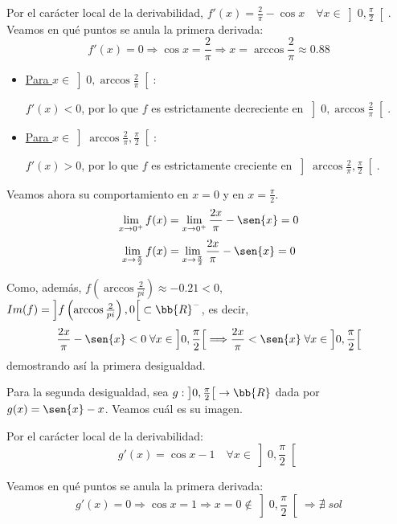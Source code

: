 \begin{ejercicio}
\begin{enumerate}
        Por el carácter local de la derivabilidad, $f'(x)=\frac{2}{\pi} - \cos{x}\quad \forall x \in \left]0, \frac{\pi}{2} \right[$. Veamos en qué puntos se anula la primera derivada:
        $$f'(x)=0 \Longrightarrow \cos{x}=\frac{2}{\pi} \Longrightarrow x=\arccos{\frac{2}{\pi}} \approx 0.88$$
        \begin{itemize}
            \item \underline{Para $x\in \left]0,\arccos{\frac{2}{\pi}}\right[$}:

            $f'(x)<0$, por lo que $f$ es estrictamente decreciente en $\left]0,\arccos{\frac{2}{\pi}}\right[$.

            \item \underline{Para $x\in \left]\arccos{\frac{2}{\pi}}, \frac{\pi}{2}\right[$}:

            $f'(x)>0$, por lo que $f$ es estrictamente creciente en $\left]\arccos{\frac{2}{\pi}}, \frac{\pi}{2}\right[$.
        \end{itemize}
        
        Veamos ahora su comportamiento en $x=0$ y en $x=\frac{\pi}{2}$.
        \begin{equation*}
            \lim_{x\to0^+}f(x)=\lim_{x\to0^+} \frac{2x}{\pi} - \sen{x} = 0
        \end{equation*}
        \begin{equation*}
            \lim_{x\to\frac{\pi}{2}}f(x)=\lim_{x\to\frac{\pi}{2}} \frac{2x}{\pi} - \sen{x} = 0
        \end{equation*}

        Como, además, $f\left(\arccos{\frac{2}{pi}}\right) \approx -0.21 <0$, $Im(f)=\left]f\left(\arccos{\frac{2}{pi}}\right) ,0\right[ \subset \bb{R}^-$, es decir,
        $$\frac{2x}{\pi} - \sen{x} <0 \;\forall x\in \left]0, \frac{\pi}{2} \right[ \Longrightarrow \frac{2x}{\pi} < \sen{x} \;\forall x\in \left]0, \frac{\pi}{2} \right[ $$
        demostrando así la primera desigualdad.

        Para la segunda desigualdad, sea $g:\left]0, \frac{\pi}{2} \right[ \to \bb{R}$ dada por $g(x)=\sen{x} -x$. Veamos cuál es su imagen.

        Por el carácter local de la derivabilidad:
        $$g'(x)=\cos{x}-1 \quad \forall x \in \left]0, \frac{\pi}{2} \right[$$

        Veamos en qué puntos se anula la primera derivada:
        $$g'(x)=0 \Longrightarrow \cos{x}=1 \Longrightarrow x=0 \notin \left]0, \frac{\pi}{2} \right[ \Longrightarrow \nexists \;sol$$


\end{enumerate}
\end{ejercicio}
